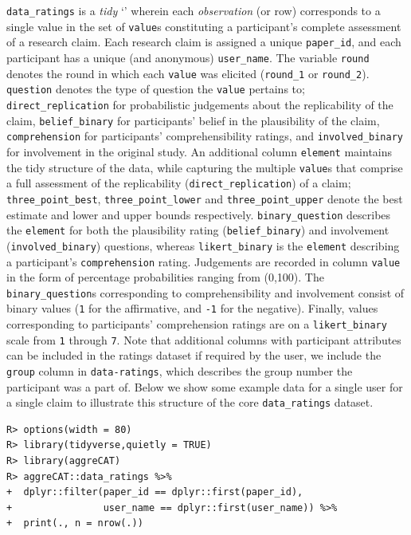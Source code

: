 \documentclass[article]{jss}
\newcommand{\class}[1]{`\code{#1}'}
\begin{document}
\texttt{data\_ratings} is a \emph{tidy} \class{data.frame} wherein each
\emph{observation} (or row) corresponds to a single value in the set of
\texttt{value}s constituting a participant's complete assessment of a
research claim. Each research claim is assigned a unique
\texttt{paper\_id}, and each participant has a unique (and anonymous)
\texttt{user\_name}. The variable \texttt{round} denotes the round in
which each \texttt{value} was elicited (\texttt{round\_1} or
\texttt{round\_2}). \texttt{question} denotes the type of question the
\texttt{value} pertains to; \texttt{direct\_replication} for
probabilistic judgements about the replicability of the claim,
\texttt{belief\_binary} for participants' belief in the plausibility of
the claim, \texttt{comprehension} for participants' comprehensibility
ratings, and \texttt{involved\_binary} for involvement in the original
study. An additional column \texttt{element} maintains the tidy
structure of the data, while capturing the multiple \texttt{value}s that
comprise a full assessment of the replicability
(\texttt{direct\_replication}) of a claim; \texttt{three\_point\_best},
\texttt{three\_point\_lower} and \texttt{three\_point\_upper} denote the
best estimate and lower and upper bounds respectively.
\texttt{binary\_question} describes the \texttt{element} for both the
plausibility rating (\texttt{belief\_binary}) and involvement
(\texttt{involved\_binary}) questions, whereas \texttt{likert\_binary}
is the \texttt{element} describing a participant's
\texttt{comprehension} rating. Judgements are recorded in column
\texttt{value} in the form of percentage probabilities ranging from
(0,100). The \texttt{binary\_question}s corresponding to
comprehensibility and involvement consist of binary values (\texttt{1}
for the affirmative, and \texttt{-1} for the negative). Finally, values
corresponding to participants' comprehension ratings are on a
\texttt{likert\_binary} scale from \texttt{1} through \texttt{7}. Note
that additional columns with participant attributes can be included in
the ratings dataset if required by the user, we include the
\texttt{group} column in \texttt{data-ratings}, which describes the
group number the participant was a part of. Below we show some example
data for a single user for a single claim to illustrate this structure
of the core \texttt{data\_ratings} dataset.

\begin{verbatim}
R> options(width = 80)
R> library(tidyverse,quietly = TRUE)
R> library(aggreCAT)
R> aggreCAT::data_ratings %>% 
+  dplyr::filter(paper_id == dplyr::first(paper_id), 
+                user_name == dplyr::first(user_name)) %>% 
+  print(., n = nrow(.))
\end{verbatim}
\end{document}
